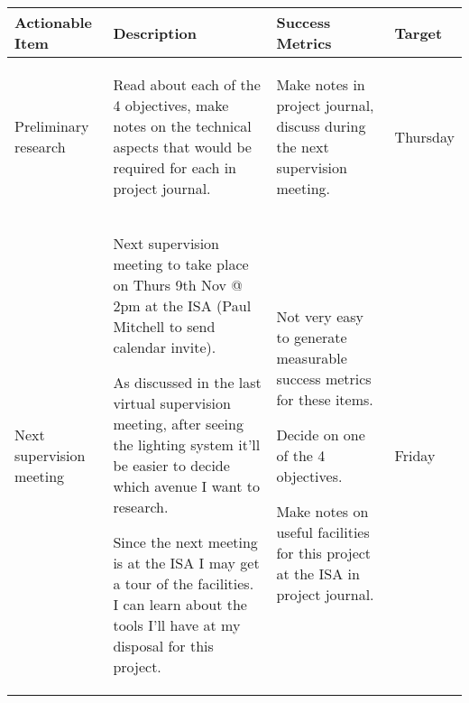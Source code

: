 \begin{table}[!h]
    \centering
    \begin{tabularx}{\textwidth}{|X|X|X|l|}
        \hline
        Actionable Item & Description & Success Metrics & Target \\
        \hline
        \hline
        Preliminary research &
        \begin{myitemize}
            \item Read about each of the 4 objectives, make notes on the technical aspects that would be required for each in project journal.
        \end{myitemize} &
        \begin{myitemize}
            \item Make notes in project journal, discuss during the next supervision meeting.
        \end{myitemize} &
        Thursday \\
        \hline
        Next supervision meeting &
        \begin{myitemize}
            \item Next supervision meeting to take place on Thurs 9th Nov @ 2pm at the ISA (Paul Mitchell to send calendar invite).
            \item As discussed in the last virtual supervision meeting, after seeing the lighting system it'll be easier to decide which avenue I want to research.
            \item Since the next meeting is at the ISA I may get a tour of the facilities. I can learn about the tools I'll have at my disposal for this project.
        \end{myitemize} &
        \begin{myitemize}
            \item Not very easy to generate measurable success metrics for these items.
            \item Decide on one of the 4 objectives.
            \item Make notes on useful facilities for this project at the ISA in project journal.
        \end{myitemize} &
        Friday \\
        \hline
    \end{tabularx}
\end{table}
